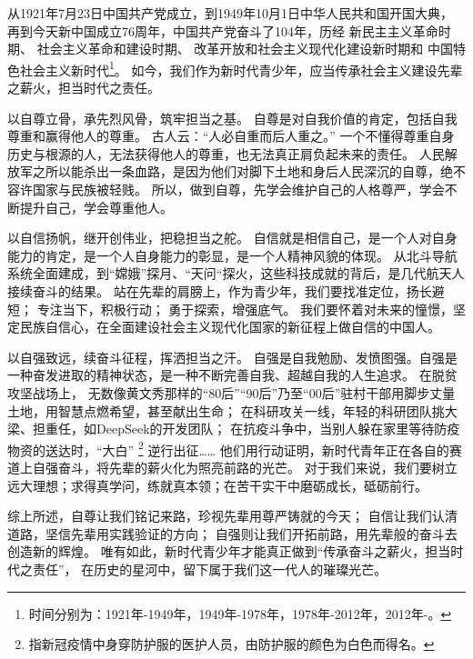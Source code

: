 \documentclass[UTF8,12pt,twoside]{article}
\begin{document}
从1921年7月23日中国共产党成立，到1949年10月1日中华人民共和国开国大典，
再到今天新中国成立76周年，中国共产党奋斗了104年，历经
新民主主义革命时期、
社会主义革命和建设时期、
改革开放和社会主义现代化建设新时期和
中国特色社会主义新时代\footnote{时间分别为：1921年-1949年，1949年-1978年，1978年-2012年，2012年-。}。
如今，我们作为新时代青少年，应当传承社会主义建设先辈之薪火，担当时代之责任。\par %
\vspace{1em}
以自尊立骨，承先烈风骨，筑牢担当之基。 %
自尊是对自我价值的肯定，包括自我尊重和赢得他人的尊重。
古人云：“人必自重而后人重之。”
一个不懂得尊重自身历史与根源的人，无法获得他人的尊重，也无法真正肩负起未来的责任。
人民解放军之所以能杀出一条血路，是因为他们对脚下土地和身后人民深沉的自尊，绝不容许国家与民族被轻贱。
所以，做到自尊，先学会维护自己的人格尊严，学会不断提升自己，学会尊重他人。\par
\vspace{1em}
以自信扬帆，继开创伟业，把稳担当之舵。 %
自信就是相信自己，是一个人对自身能力的肯定，是一个人自身能力的彰显，是一个人精神风貌的体现。
从北斗导航系统全面建成，到“嫦娥”探月、“天问“探火，这些科技成就的背后，是几代航天人接续奋斗的结果。
站在先辈的肩膀上，作为青少年，我们要找准定位，扬长避短；
专注当下，积极行动；
勇于探索，增强底气。
我们要怀着对未来的憧憬，坚定民族自信心，在全面建设社会主义现代化国家的新征程上做自信的中国人。\par
\vspace{1em}
以自强致远，续奋斗征程，挥洒担当之汗。 %
自强是自我勉励、发愤图强。自强是一种奋发进取的精神状态，是一种不断完善自我、超越自我的人生追求。
在脱贫攻坚战场上，
无数像黄文秀那样的“80后”“90后”乃至“00后”驻村干部用脚步丈量土地，用智慧点燃希望，甚至献出生命；
在科研攻关一线，年轻的科研团队挑大梁、担重任，如DeepSeek的开发团队；
在抗疫斗争中，当别人躲在家里等待防疫物资的送达时，“大白”
\footnote{指新冠疫情中身穿防护服的医护人员，由防护服的颜色为白色而得名。}
逆行出征……
他们用行动证明，新时代青年正在各自的赛道上自强奋斗，将先辈的薪火化为照亮前路的光芒。
对于我们来说，我们要树立远大理想；求得真学问，练就真本领；在苦干实干中磨砺成长，砥砺前行。\par
\vspace{1em}
综上所述，自尊让我们铭记来路，珍视先辈用尊严铸就的今天；
自信让我们认清道路，坚信先辈用实践验证的方向；
自强则让我们开拓前路，用先辈般的奋斗去创造新的辉煌。
唯有如此，新时代青少年才能真正做到“传承奋斗之薪火，担当时代之责任”，
在历史的星河中，留下属于我们这一代人的璀璨光芒。

\begingroup
    \renewcommand{\thefootnote}{} %
\endgroup
\end{document}
